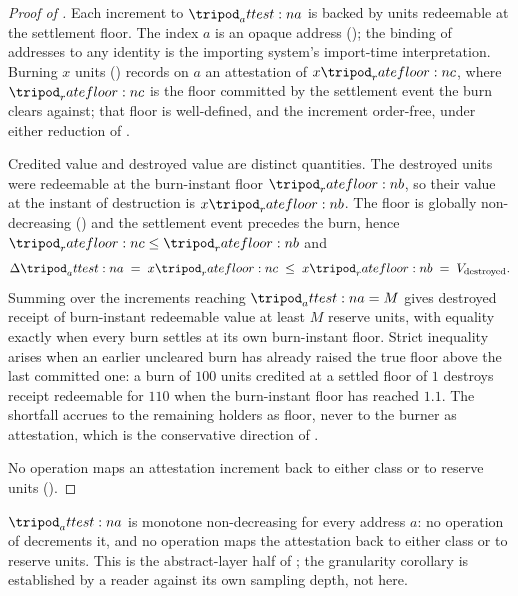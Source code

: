 \documentclass[../main.tex]{subfiles}
\begin{document}
\begin{proof}[Proof of ]
    Each increment to $\attest{a}$ is backed by \liveclass{} units redeemable at the
    settlement floor. The index $a$ is an opaque address
    (); the binding of addresses to any identity is the
    importing system's import-time interpretation. Burning $x$ \liveclass{} units
    () records on $a$ an attestation of $x\ratefloor{c}$, where
    $\ratefloor{c}$ is the floor committed by the settlement event the burn clears against;
    that floor is well-defined, and the increment order-free, under either reduction of
    .

    Credited value and destroyed value are distinct quantities. The destroyed \liveclass{}
    units were redeemable at the burn-instant floor $\ratefloor{b}$, so their value at the
    instant of destruction is $x\ratefloor{b}$. The floor is globally non-decreasing
    () and the settlement event precedes the burn,
    hence $\ratefloor{c} \leq \ratefloor{b}$ and
    \[
        \Delta\attest{a} \;=\; x\ratefloor{c} \;\leq\; x\ratefloor{b} \;=\; V_{\text{destroyed}}.
    \]
    Summing over the increments reaching $\attest{a} = M$ gives destroyed receipt of
    burn-instant redeemable value at least $M$ reserve units, with equality exactly when
    every burn settles at its own burn-instant floor. Strict inequality arises when an
    earlier uncleared burn has already raised the true floor above the last committed one:
    a burn of $100$ units credited at a settled floor of $1$ destroys receipt redeemable
    for $110$ when the burn-instant floor has reached $1.1$. The shortfall accrues to the
    remaining holders as floor, never to the burner as attestation, which is the
    conservative direction of .

    No operation maps an attestation increment back to either class or to reserve units
    ().
\end{proof}

\begin{lemma}
    \label{lem:costliness:attestation-append-only}
    $\attest{a}$ is monotone non-decreasing for every address $a$: no operation of
     decrements it, and no operation maps the attestation back to
    either class or to reserve units. This is the abstract-layer half of
    ; the granularity corollary is established by a reader
    against its own sampling depth, not here.
\end{lemma}
\end{document}
